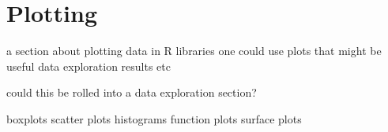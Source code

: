 
\section{Plotting} 
\label{advanced:plotting}

a section about plotting data in R
libraries one could use
plots that might be useful
data exploration
results 
etc

could this be rolled into a data exploration section?


boxplots
scatter plots
histograms
function plots
surface plots

